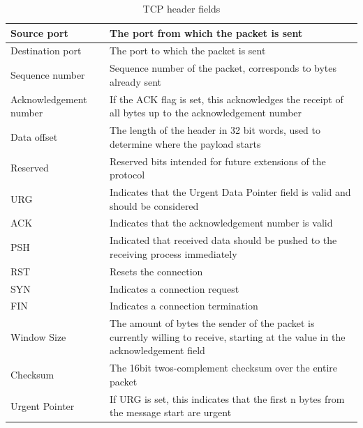 \documentclass[a4paper, 11 pt, article, accentcolor=tud7b]{tudreport}
\begin{document}
	\begin{table}[h]
	  \centering
	  \begin{tabularx}{\linewidth}{|l|X|}
	    \hline
	    Source port & The port from which the packet is sent \\ \hline
	    Destination port & The port to which the packet is sent \\ \hline
	    Sequence number & Sequence number of the packet, corresponds to bytes already sent \\ \hline
	    Acknowledgement number & If the ACK flag is set, this acknowledges the receipt of all bytes up to the acknowledgement number \\ \hline
	    Data offset & The length of the header in 32 bit words, used to determine where the payload starts \\ \hline
	    Reserved & Reserved bits intended for future extensions of the protocol \\ \hline
	    URG & Indicates that the Urgent Data Pointer field is valid and should be considered \\ \hline
	    ACK & Indicates that the acknowledgement number is valid \\ \hline
	    PSH & Indicated that received data should be pushed to the receiving process immediately \\ \hline
	    RST & Resets the connection \\ \hline
	    SYN & Indicates a connection request \\ \hline
	    FIN & Indicates a connection termination \\ \hline
	    Window Size & The amount of bytes the sender of the packet is currently willing to receive, starting at the value in the acknowledgement field \\ \hline
	    Checksum & The 16bit twos-complement checksum over the entire packet \\ \hline
	    Urgent Pointer & If URG is set, this indicates that the first n bytes from the message start are urgent \\ \hline
	  \end{tabularx}
	  \caption{TCP header fields}
	\end{table}
	
\end{document}
